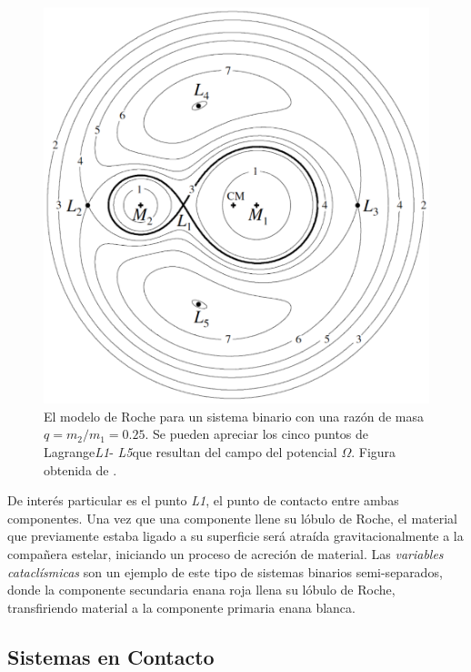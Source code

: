 \begin{figure}[!ht]
	\centering
	\includegraphics[scale=0.34]{Introduccion/Figures/Figura Lagrange_CVs Wide Field Surveys.png}
	\caption{El modelo de Roche para un sistema binario con una razón de masa $q
	= m_2 / m_1 = 0.25$. Se pueden apreciar los cinco puntos de
	Lagrange\textemdash \textit{L1}- \textit{L5}\textemdash que resultan del
	campo del potencial $\Omega$. Figura obtenida de
	.}
	\label{figuraLagrange}
\end{figure}

De interés particular es el punto \textit{L1}, el punto de contacto entre ambas
componentes. Una vez que una componente llene su lóbulo de Roche, el material
que previamente estaba ligado a su superficie será atraída gravitacionalmente a
la compañera estelar, iniciando un proceso de acreción de material. Las
\textit{variables cataclísmicas} son un ejemplo de este tipo de sistemas
binarios semi-separados, donde la componente secundaria enana roja llena su
lóbulo de Roche, transfiriendo material a la componente primaria enana blanca.

\subsection{Sistemas en Contacto}

